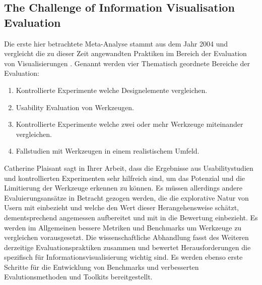\documentclass[draft=false
              ,paper=a4
              ,twoside=false
              ,fontsize=11pt
              ,headsepline
              ,BCOR10mm
              ,DIV11
              ]{scrbook}
\begin{document}
\subsection{The Challenge of Information Visualisation Evaluation} %
\label{sub:the_challenge_of_information_visualisation_evaluation}
Die erste hier betrachtete Meta-Analyse stammt aus dem Jahr 2004 und vergleicht die zu dieser Zeit angewandten Praktiken im Bereich der Evaluation von Visualisierungen \cite{plaisant_challenge_2004}. Genannt werden vier Thematisch geordnete Bereiche der Evaluation:

\begin{enumerate}
  \item Kontrollierte Experimente welche Designelemente vergleichen.
  \item Usability Evaluation von Werkzeugen.
  \item Kontrollierte Experimente welche zwei oder mehr Werkzeuge miteinander vergleichen.
  \item Fallstudien mit Werkzeugen in einem realistischem Umfeld.
\end{enumerate}

Catherine Plaisant  sagt in Ihrer Arbeit, dass die Ergebnisse aus Usabilitystudien und kontrollierten Experimenten sehr hilfreich sind, um das Potenzial und die Limitierung der Werkzeuge erkennen zu können. Es müssen allerdings andere Evaluierungsansätze in Betracht gezogen werden, die die explorative Natur von Usern mit einbezieht und welche den Wert dieser Herangehensweise schätzt, dementsprechend angemessen aufbereitet und mit in die Bewertung einbezieht. Es werden im Allgemeinen bessere Metriken und Benchmarks um Werkzeuge zu vergleichen vorausgesetzt. Die wissenschaftliche Abhandlung fasst des Weiteren derzeitige Evaluationspraktiken zusammen und bewertet Herausforderungen die spezifisch für Informationsvisualisierung wichtig sind. Es werden ebenso erste Schritte für die Entwicklung von Benchmarks und verbesserten Evalutionsmethoden und Toolkits bereitgestellt.
\end{document}
